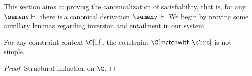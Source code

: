 \documentclass[acmsmall,screen,nonacm,review]{acmart}
\begin{document}
This section aims at proving the canonicalization of satisfiability, that is,
for any $\semenv \th \c$, there is a canonical derivation $\semenv \Th \c$.
%
We begin by proving some auxillary lemmas regarding inversion and
entailment in our system.

\begin{lemma}
  \label{lem:match-is-not-simple}
  For any constraint context $\C\where{\square}$,
  the constraint $\C\where{\cmatch \t \cbrs}$ is not simple.
  \begin{proof}
    Structural induction on $\C$.
  \end{proof}
\end{lemma}

\newcommand{\simplePf}[2]{\Pf{#1}{}{\simple}{#2}}
\newcommand{\nsimplePf}[2]{\Pf{}{\neg}{#1 \simple}{#2}}
\newcommand{\shapePf}[4]{\Pf{}{}{\Cshape {#1} {#2} {#3}}{#4}}
\end{document}
